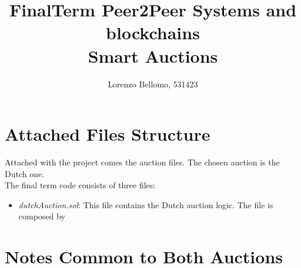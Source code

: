 \documentclass[11pt, a4paper]{report}
\title{
	FinalTerm Peer2Peer Systems and blockchains \\
	\large Smart Auctions}
\author{Lorenzo Bellomo, 531423}
\date{}
\begin{document}
	\maketitle
	
\section*{Attached Files Structure}

	Attached with the project comes the auction files. The chosen auction is the Dutch one. \\
	The final term code consists of three files:
	\begin{itemize}
		\item \emph{dutchAuction.sol}: This file contains the Dutch auction logic. The file is composed by 
	\end{itemize}

\section*{Notes Common to Both Auctions}
\end{document}
